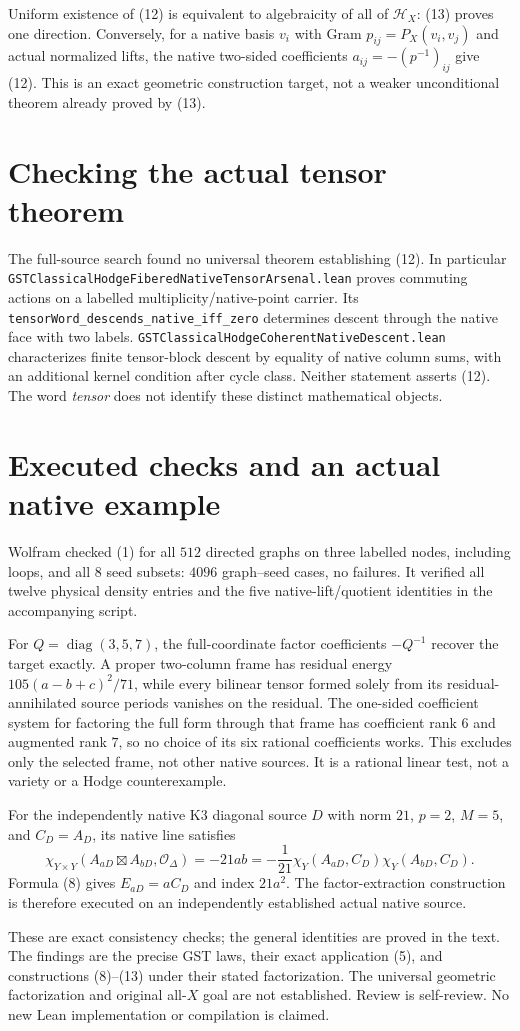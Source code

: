 \documentclass[11pt]{article}
\begin{document}
Uniform existence of (12) is equivalent to algebraicity
of all of $\mathcal H_X$: (13) proves one direction.
Conversely, for a native basis $v_i$ with Gram
$p_{ij}=P_X(v_i,v_j)$ and actual normalized lifts,
the native two-sided coefficients $a_{ij}=-(p^{-1})_{ij}$
give (12). This is an exact geometric construction target,
not a weaker unconditional theorem already proved by (13).

\section{Checking the actual tensor theorem}
The full-source search found no universal theorem establishing (12).
In particular
\texttt{GSTClassicalHodgeFiberedNativeTensorArsenal.lean}
proves commuting actions on a labelled multiplicity/native-point
carrier. Its
\texttt{tensorWord\_descends\_native\_iff\_zero}
determines descent through the native face with two labels.
\texttt{GSTClassicalHodgeCoherentNativeDescent.lean} characterizes
finite tensor-block descent by equality of native column sums,
with an additional kernel condition after cycle class.
Neither statement asserts (12). The word \emph{tensor}
does not identify these distinct mathematical objects.

\section{Executed checks and an actual native example}
Wolfram checked (1) for all $512$ directed graphs on three
labelled nodes, including loops, and all $8$ seed subsets:
$4096$ graph--seed cases, no failures.
It verified all twelve physical density entries and the five
native-lift/quotient identities in the accompanying script.

For $Q=\operatorname{diag}(3,5,7)$, the full-coordinate factor
coefficients $-Q^{-1}$ recover the target exactly.
A proper two-column frame has residual energy
$105(a-b+c)^2/71$, while every bilinear tensor formed solely
from its residual-annihilated source periods vanishes on
the residual. The one-sided coefficient system for factoring the
full form through that frame has coefficient rank $6$ and
augmented rank $7$, so no choice of its six rational coefficients
works. This excludes only the selected frame, not other native
sources. It is a rational linear test, not a variety or a
Hodge counterexample.

For the independently native K3 diagonal source $D$ with
norm $21$, $p=2$, $M=5$, and $C_D=A_D$, its native line satisfies
\[
 \chi_{Y\times Y}(A_{aD}\boxtimes A_{bD},\mathcal O_\Delta)
  =-21ab
  =-\frac1{21}\chi_Y(A_{aD},C_D)\chi_Y(A_{bD},C_D).
\]
Formula (8) gives $E_{aD}=aC_D$ and index $21a^2$.
The factor-extraction construction is therefore executed on
an independently established actual native source.

These are exact consistency checks; the general identities
are proved in the text.
The findings are the precise GST laws, their exact application
(5), and constructions (8)--(13) under their stated factorization.
The universal geometric factorization and original all-$X$
goal are not established.
Review is self-review. No new Lean implementation or
compilation is claimed.
\end{document}
